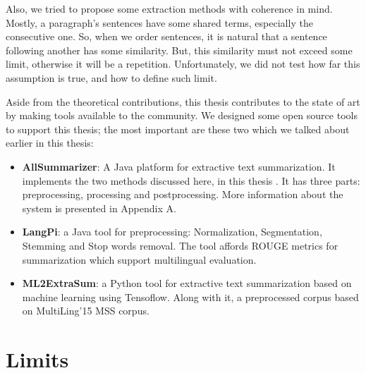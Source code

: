 Also, we tried to propose some extraction methods with coherence in mind. 
Mostly, a paragraph's sentences have some shared terms, especially the consecutive one. 
So, when we order sentences, it is natural that a sentence following another has some similarity. 
But, this similarity must not exceed some limit, otherwise it will be a repetition. 
Unfortunately, we did not test how far this assumption is true, and how to define such limit.

Aside from the theoretical contributions, this thesis contributes to the state of art by making tools available to the community. 
We designed some open source tools to support this thesis; the most important are these two which we talked about earlier in this thesis:
\begin{itemize}
	\item \textbf{AllSummarizer}: A Java platform for extractive text summarization. 
	It implements the two methods discussed here, in this thesis \citep{13-aries-al,15-aries-al,18-aries-al,21-aries-al}.
	It has three parts: preprocessing, processing and postprocessing. 
	More information about the system is presented in Appendix A.
	
	\item \textbf{LangPi}: a Java tool for preprocessing: Normalization, Segmentation, Stemming and Stop words removal.
	The tool affords ROUGE metrics for summarization which support multilingual evaluation. 
	
	\item \textbf{ML2ExtraSum}: a Python tool for extractive text summarization based on machine learning using Tensoflow. 
	Along with it, a preprocessed corpus based on MultiLing'15 MSS corpus.
	
\end{itemize}


\section{Limits}

